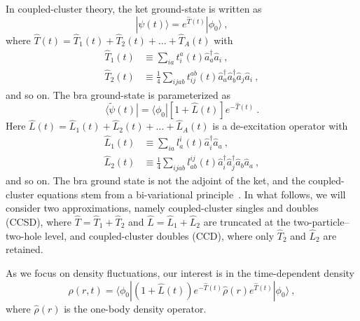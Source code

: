 \documentclass[aps,prc,twocolumn,showpacs,floatfix,nofootinbib,superscriptaddress,amsmath,amssymb,longbibliography,amsproc]{revtex4-2}
\begin{document}
In coupled-cluster theory, the ket ground-state is written as
\begin{equation}
\label{ket}
    |\psi(t)\rangle = e^{\hat{T}(t)}|\phi_0\rangle \ ,
\end{equation}
where $\hat{T}(t)= \hat{T}_1(t) +\hat{T}_2(t) + \ldots +\hat{T}_A(t)$ with
\begin{align}
    \hat{T}_1(t) & \equiv \sum_{ia} t_i^a(t) \hat{a}^\dagger_a\hat{a}_i \ , \\
    \hat{T}_2(t) & \equiv \frac{1}{4}\sum_{ijab} t_{ij}^{ab}(t) \hat{a}^\dagger_a\hat{a}^\dagger_b\hat{a}_j\hat{a}_i \ ,
\end{align}
and so on. The bra ground-state is parameterized as
\begin{equation}
\label{bra}
    \langle \widetilde{\psi}(t)| = \langle\phi_0|\left[1+\hat{L}(t)\right] e^{-\hat{T}(t)} \ .
\end{equation}
Here $\hat{L}(t)= \hat{L}_1(t) +\hat{L}_2(t) + \ldots +\hat{L}_A(t)$  is a de-excitation operator with
\begin{align}
    \hat{L}_1(t) & \equiv \sum_{ia} l^i_a(t) \hat{a}^\dagger_i\hat{a}_a \ , \\
    \hat{L}_2(t) & \equiv \frac{1}{4}\sum_{ijab} l^{ij}_{ab}(t) \hat{a}^\dagger_i\hat{a}^\dagger_j\hat{a}_b\hat{a}_a \ ,
\end{align}
and so on. The bra ground state is not the adjoint of the ket, and the coupled-cluster equations stem from a bi-variational principle~\cite{kvaal2012,kvaal2025}. In what follows, we will consider two approximations, namely coupled-cluster singles and doubles (CCSD), where $\hat{T}=\hat{T}_1+\hat{T}_2$ and $\hat{L}=\hat{L}_1+\hat{L}_2$ are truncated at the two-particle--two-hole level, and coupled-cluster doubles (CCD), where only $\hat{T}_2$ and $\hat{L}_2$ are retained.

As we focus on density fluctuations, our interest is in the time-dependent density
\begin{equation}
    \rho(r,t) = \langle\phi_0|\left(1+\hat{L}(t)\right)e^{-\hat{T}(t)} \hat{\rho}(r) e^{\hat{T}(t)} |\phi_0\rangle \ ,
\end{equation}
where $\hat{\rho}(r)$ is the one-body density operator.
\end{document}
